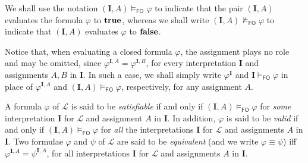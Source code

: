 \documentclass[a4paper]{llncs}
\newcommand{\Lang}{\ensuremath{\mathcal{L}\xspace}} %
\newcommand{\corr}[1]{#1}
\newcommand{\inter}{\ensuremath{\mathbf{I}}\xspace}
\newcommand{\fomodels}[2]{#1 \models_{\mathsf{FO}} #2}
\newcommand{\notfomodels}[2]{#1 \not\models_{\mathsf{FO}} #2}
\newcommand{\fosat}[1]{\fomodels{*}{#1}}
\begin{document}
\corr{We shall use the notation $\fomodels{(\inter, A)}{\varphi}$ to indicate
that the pair $(\inter, A)$ evaluates the formula $\varphi$ to $\mathbf{true}$,
whereas we shall write $\notfomodels{(\inter, A)}{\varphi}$ to indicate
that $(\inter, A)$ evaluates $\varphi$ to $\mathbf{false}$.}

Notice that, when evaluating a closed formula $\varphi$, the 
assignment plays no role and may be omitted, since $\varphi^{\inter, 
A} = \varphi^{\inter, B}$, for every interpretation $\inter$ and 
assignments $A,B$ in $\inter$. In such a case, we shall simply write 
$\varphi^{\inter}$
and $\fomodels{\inter}{\varphi}$ in place of $\varphi^{\inter, A}$ 
and $\fomodels{(\inter, A)}{\varphi}$, respectively, for any 
assignment $A$.


A formula $\varphi$ of $\Lang$ is said to be \emph{satisfiable}
if and only if $\fomodels{(\inter,A)}{\varphi}$ for \emph{some} interpretation
$\inter$ for $\Lang$ and assignment $A$ in $\inter$.
In addition, $\varphi$ is said to be \emph{valid} 
if and only if
$\fomodels{(\inter,A)}{\varphi}$ for \emph{all} the interpretations $\inter$
for $\Lang$ and assignments $A$ in $\inter$.
Two formulae $\varphi$ and $\psi$ of $\Lang$ are said to be
\emph{equivalent} (and we write $\varphi \equiv \psi$) iff 
$\varphi^{\inter,A} = \psi^{\inter,A}$,
for all interpretations $\inter$
for $\Lang$ and assignments $A$ in $\inter$.
\end{document}
